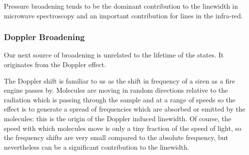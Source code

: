 \documentclass{article}
\theoremstyle{plain}\theoremheaderfont{\normalfont\itshape}\theorembodyfont{\rmfamily}\theoremseparator{.}\newtheorem*{rem}{Remark}\newtheorem*{ex}{Example}\newtheorem*{proof}{Proof}\newtheorem*{altp}{Alternative proof}
\theoremstyle{plain}\theoremheaderfont{\normalfont\bfseries}\theorembodyfont{\rmfamily}\theoremseparator{.}\newtheorem{thm}{Theorem}[section]\newtheorem{lem}[thm]{Lemma}\newtheorem{prop}[thm]{Proposition}\newtheorem*{cor}{Corollary}\newtheorem{defn}[thm]{Definition}\newtheorem{clm}[thm]{Claim}\newtheorem{clminproof}{Claim}\newtheorem{pos}{Postulate}[section]
\theoremstyle{break}\theoremheaderfont{\normalfont\itshape}\theorembodyfont{\rmfamily}\theoremseparator{.\medskip}\newtheorem*{proofskip}{Proof}\newtheorem*{exs}{Examples}\newtheorem*{rems}{Remarks}
\theoremstyle{break}\theoremheaderfont{\normalfont\bfseries}\theorembodyfont{\rmfamily}\theoremseparator{.\medskip}\newtheorem{lemskip}[thm]{Lemma}\newtheorem{defnskip}[thm]{Definition}\newtheorem{propskip}[thm]{Proposition}\newtheorem{thmskip}[thm]{Theorem}
\numberwithin{equation}{section}
\begin{document}
    Pressure broadening tends to be the dominant contribution to the linewidth in microwave spectroscopy and an important contribution for lines in the infra-red.

    \subsubsection{Doppler Broadening}
    Our next source of broadening is unrelated to the lifetime of the states. It originates from the Doppler effect.

    The Doppler shift is familiar to us as the shift in frequency of a siren as a fire engine passes by. Molecules are moving in random directions relative to the radiation which is passing through the sample and at a range of speeds so the effect is to generate a spread of frequencies which are absorbed or emitted by the molecules: this is the origin of the Doppler induced linewidth. Of course, the speed with which molecules move is only a tiny fraction of the speed of light, so the frequency shifts are very small compared to the absolute frequency, but nevertheless can be a significant contribution to the linewidth.

    \begin{figure}[ht!]
        \centering
    \end{figure}
\end{document}
